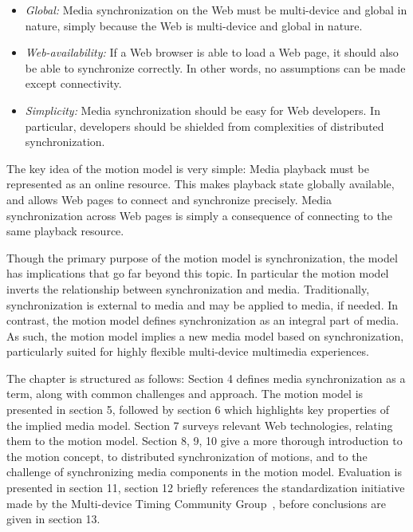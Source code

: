 \begin{itemize}
\item{\emph{Global:} Media synchronization on the Web must be multi-device 
and global in nature, simply because the Web is multi-device and global in nature.}
\item{\emph{Web-availability:} If a Web browser is able to load a Web page, 
it should also be able to synchronize correctly. In other words, no assumptions 
can be made except connectivity.}
\item{\emph{Simplicity:} Media synchronization should be easy for Web developers. 
In particular, developers should be shielded from complexities of distributed synchronization.}
\end{itemize}

The key idea of the motion model is very simple: Media playback must be
represented as an online resource. This makes playback state globally
available, and allows Web pages to connect and synchronize precisely. Media
synchronization across Web pages is simply a consequence of connecting to the
same playback resource.

Though the primary purpose of the motion model is synchronization, the model
has implications that go far beyond this topic. In particular the motion model
inverts the relationship between synchronization and media. Traditionally,
synchronization is external to media and may be applied to media, if needed.
In contrast, the motion model defines synchronization as an integral part of
media. As such, the motion model implies a new media model based on
synchronization, particularly suited for highly flexible multi-device
multimedia experiences.

The chapter is structured as follows: Section 4 defines media synchronization
as a term, along with common challenges and approach. The motion model is
presented in section 5, followed by section 6 which highlights key properties
of the implied media model. Section 7 surveys relevant Web technologies,
relating them to the motion model. Section 8, 9, 10 give a more thorough
introduction to the motion concept, to distributed synchronization of motions,
and to the challenge of synchronizing media components in the motion model.
Evaluation is presented in section 11, section 12 briefly references the
standardization initiative made by the Multi-device Timing Community
Group~\cite{mtcg}, before conclusions are given in section 13.

